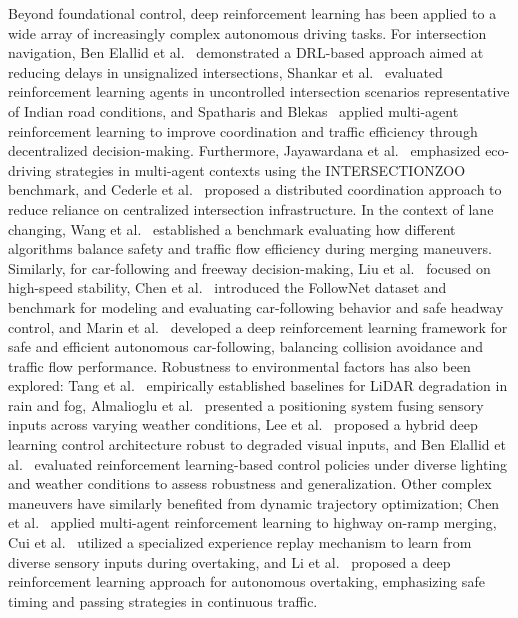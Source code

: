 \documentclass[]{interact}
\begin{document}
Beyond foundational control, deep reinforcement learning has been applied to a wide array of increasingly complex autonomous driving tasks. For intersection navigation, Ben Elallid et al.~\cite{benelallid2023intersection} demonstrated a DRL-based approach aimed at reducing delays in unsignalized intersections, Shankar et al.~\cite{shankar2025deep} evaluated reinforcement learning agents in uncontrolled intersection scenarios representative of Indian road conditions, and Spatharis and Blekas~\cite{Spatharis02012024} applied multi-agent reinforcement learning to improve coordination and traffic efficiency through decentralized decision-making. Furthermore, Jayawardana et al.~\cite{jayawardana2023} emphasized eco-driving strategies in multi-agent contexts using the INTERSECTIONZOO benchmark, and Cederle et al.~\cite{cederle2024distributed} proposed a distributed coordination approach to reduce reliance on centralized intersection infrastructure. In the context of lane changing, Wang et al.~\cite{wang2024benchmarking} established a benchmark evaluating how different algorithms balance safety and traffic flow efficiency during merging maneuvers. Similarly, for car-following and freeway decision-making, Liu et al.~\cite{liu2024comparative} focused on high-speed stability, Chen et al.~\cite{chen2023follownet} introduced the FollowNet dataset and benchmark for modeling and evaluating car-following behavior and safe headway control, and Marin et al.~\cite{Marin04122025} developed a deep reinforcement learning framework for safe and efficient autonomous car-following, balancing collision avoidance and traffic flow performance. Robustness to environmental factors has also been explored: Tang et al.~\cite{tang2020} empirically established baselines for LiDAR degradation in rain and fog, Almalioglu et al.~\cite{almalioglu2022} presented a positioning system fusing sensory inputs across varying weather conditions, Lee et al.~\cite{lee2024robust} proposed a hybrid deep learning control architecture robust to degraded visual inputs, and Ben Elallid et al.~\cite{BenElallid02112025} evaluated reinforcement learning-based control policies under diverse lighting and weather conditions to assess robustness and generalization. Other complex maneuvers have similarly benefited from dynamic trajectory optimization; Chen et al.~\cite{chen2023rampmerging} applied multi-agent reinforcement learning to highway on-ramp merging, Cui et al.~\cite{cui2023multiinput} utilized a specialized experience replay mechanism to learn from diverse sensory inputs during overtaking, and Li et al.~\cite{li2020deepRL} proposed a deep reinforcement learning approach for autonomous overtaking, emphasizing safe timing and passing strategies in continuous traffic.
\end{document}
